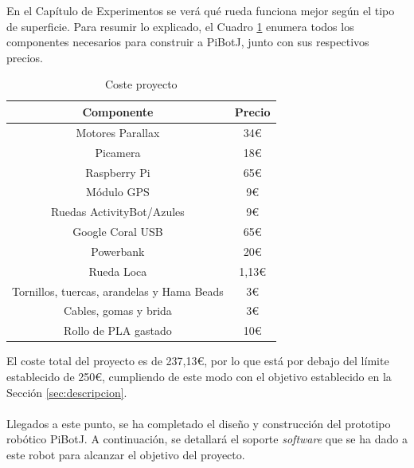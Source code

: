 En el Capítulo de Experimentos se verá qué rueda funciona mejor según el tipo de superficie. Para resumir lo explicado, el Cuadro \ref{cuadro:costetotal} enumera todos los componentes necesarios para construir a PiBotJ, junto con sus respectivos precios.

\begin{table}[H]
	\begin{center}
		\begin{tabular}{|c|c|}
			\hline
			Componente & Precio \\
			\hline
			Motores Parallax & 34€ \\
			\hline
			Picamera &  18€ \\
			\hline
			Raspberry Pi & 65€ \\
			\hline
			Módulo \acs{GPS} & 9€ \\
			\hline
			Ruedas ActivityBot/Azules & 9€ \\
			\hline
			Google Coral USB & 65€ \\
			\hline
			Powerbank & 20€ \\
			\hline
			Rueda Loca & 1,13€ \\
			\hline
			Tornillos, tuercas, arandelas y Hama Beads & 3€ \\
			\hline
			Cables, gomas y brida & 3€ \\
			\hline
			Rollo de PLA gastado & 10€ \\
			\hline
		\end{tabular}
		\caption{Coste proyecto}
		\label{cuadro:costetotal}
	\end{center}
\end{table}

El coste total del proyecto es de 237,13€, por lo que está por debajo del límite establecido de 250€, cumpliendo de este modo con el objetivo establecido en la Sección \ref{sec:descripcion}.\\\\



Llegados a este punto, se ha completado el diseño y construcción del prototipo robótico PiBotJ. A continuación, se detallará el soporte \textit{software} que se ha dado a este robot para alcanzar el objetivo del proyecto.

